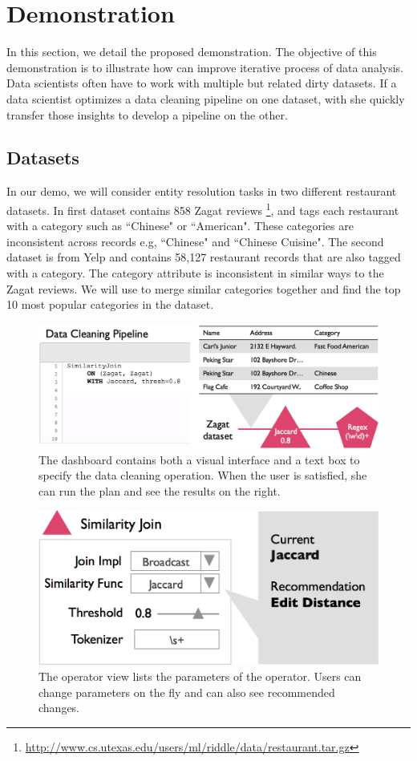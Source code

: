 \section{Demonstration}
In this section, we detail the proposed demonstration.
The objective of this demonstration is to illustrate 
how \sys can improve iterative process of data analysis.
Data scientists often have to work with multiple but related dirty datasets.
If a data scientist optimizes a data cleaning pipeline on one dataset, with \sys 
she quickly transfer those insights to develop a pipeline on the other.

\subsection{Datasets}
In our demo, we will consider entity resolution tasks in two different restaurant datasets.
In first dataset contains 858 Zagat reviews \footnote{\scriptsize{ \url{http://www.cs.utexas.edu/users/ml/riddle/data/restaurant.tar.gz}}},
and tags each restaurant with a category such as ``Chinese" or ``American".
These categories are inconsistent across records e.g, ``Chinese" and ``Chinese Cuisine".
The second dataset is from Yelp and contains 58,127 restaurant records that are also tagged with a category.
The category attribute is inconsistent in similar ways to the Zagat reviews.
We will use \sys to merge similar categories together and find the top 10 most popular categories in the dataset.

\begin{figure}[t]
\centering
 \includegraphics[width=0.75\columnwidth]{figs/dashboard_screenshot.png}
 \caption{The dashboard contains both a visual interface and a text box to specify the data cleaning operation. When the user is satisfied, she can run the plan and see the results on the right. \label{screenshot}}
\end{figure}


\begin{figure}[t]
\centering
 \includegraphics[width=0.65\columnwidth]{figs/dashboard_recsys.png}
 \caption{The operator view lists the parameters of the operator. Users can change parameters on the fly and can also see recommended changes. \label{screenshot-rec}}\vspace{-1.75em}
\end{figure}

